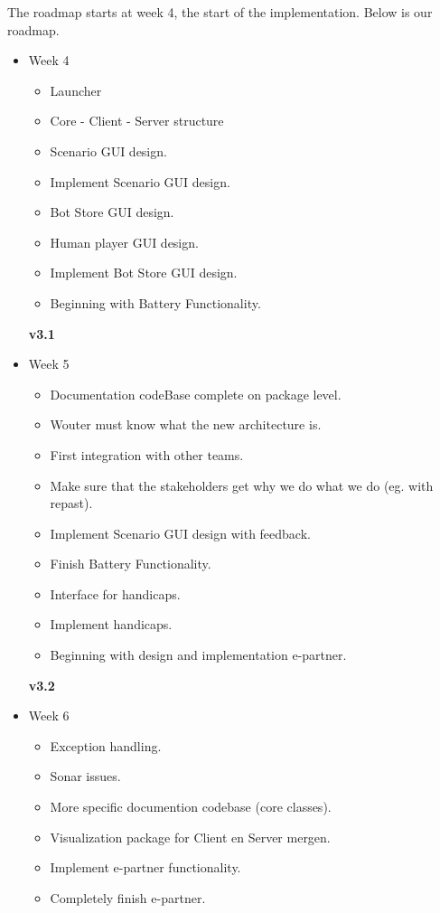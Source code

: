The roadmap starts at week 4, the start of the implementation. Below is our roadmap.

\begin{itemize}
  \item Week 4
  \begin{itemize}
    \item Launcher
      \item Core - Client - Server structure
    \item Scenario GUI design.
    \item Implement Scenario GUI design.
    \item Bot Store GUI design.
    \item Human player GUI design.
    \item Implement Bot Store GUI design.
    \item Beginning with Battery Functionality.
  \end{itemize}
  \textbf{v3.1}
  \item Week 5
  \begin{itemize}
    \item Documentation codeBase complete on package level.
      \item Wouter must know what the new architecture is.
      \item First integration with other teams.
      \item Make sure that the stakeholders get why we do what we do (eg. with repast).
    \item Implement Scenario GUI design with feedback.
    \item Finish Battery Functionality.
    \item Interface for handicaps.
    \item Implement handicaps.
    \item Beginning with design and implementation \gls{e-partner}.
  \end{itemize}
  \textbf{v3.2}
  \item Week 6
  \begin{itemize}
    \item Exception handling.
        \item Sonar issues.
        \item More specific documention codebase (core classes).
        \item Visualization package for Client en Server mergen.
    \item Implement \gls{e-partner} functionality.
    \item Completely finish \gls{e-partner}.

\end{itemize}
\end{itemize}
